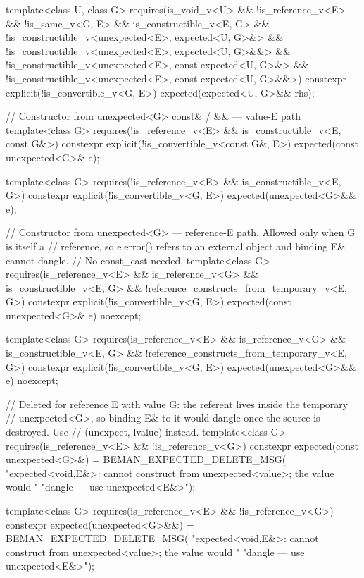 \begin{codeblock}
{  template<class U, class G>
    requires(is_void_v<U> && !is_reference_v<E> && !is_same_v<G, E> &&
             is_constructible_v<E, G> &&
             !is_constructible_v<unexpected<E>, expected<U, G>&> &&
             !is_constructible_v<unexpected<E>, expected<U, G>&&> &&
             !is_constructible_v<unexpected<E>, const expected<U, G>&> &&
             !is_constructible_v<unexpected<E>, const expected<U, G>&&>)
  constexpr explicit(!is_convertible_v<G, E>) expected(expected<U, G>&& rhs);

  // Constructor from unexpected<G> const& / && — value-E path
  template<class G>
    requires(!is_reference_v<E> && is_constructible_v<E, const G&>)
  constexpr explicit(!is_convertible_v<const G&, E>) expected(const unexpected<G>& e);

  template<class G>
    requires(!is_reference_v<E> && is_constructible_v<E, G>)
  constexpr explicit(!is_convertible_v<G, E>) expected(unexpected<G>&& e);

  // Constructor from unexpected<G> — reference-E path. Allowed only when G is itself a
  // reference, so e.error() refers to an external object and binding E& cannot dangle.
  // No const_cast needed.
  template<class G>
    requires(is_reference_v<E> && is_reference_v<G> && is_constructible_v<E, G> &&
             !reference_constructs_from_temporary_v<E, G>)
  constexpr explicit(!is_convertible_v<G, E>) expected(const unexpected<G>& e) noexcept;

  template<class G>
    requires(is_reference_v<E> && is_reference_v<G> && is_constructible_v<E, G> &&
             !reference_constructs_from_temporary_v<E, G>)
  constexpr explicit(!is_convertible_v<G, E>) expected(unexpected<G>&& e) noexcept;

  // Deleted for reference E with value G: the referent lives inside the temporary
  // unexpected<G>, so binding E& to it would dangle once the source is destroyed. Use
  // (unexpect, lvalue) instead.
  template<class G>
    requires(is_reference_v<E> && !is_reference_v<G>)
  constexpr expected(const unexpected<G>&) = BEMAN_EXPECTED_DELETE_MSG(
      "expected<void,E&>: cannot construct from unexpected<value>; the value would "
      "dangle — use unexpected<E&>");

  template<class G>
    requires(is_reference_v<E> && !is_reference_v<G>)
  constexpr expected(unexpected<G>&&) = BEMAN_EXPECTED_DELETE_MSG(
      "expected<void,E&>: cannot construct from unexpected<value>; the value would "
      "dangle — use unexpected<E&>");

}
\end{codeblock}
